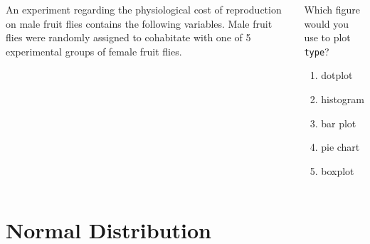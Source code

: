 \begin{frame}
\frametitle{\grp}
\begin{columns}
An experiment regarding the physiological cost of reproduction on male fruit flies contains the following variables. Male fruit flies were randomly assigned to cohabitate with one of 5 experimental groups of female fruit flies.  \\
\vskip10pt
\begin{clicker}{Which figure would you use to plot \texttt{type}?}
\begin{enumerate}
    \item dotplot
    \item histogram
    \item bar plot
    \item pie chart
    \item boxplot
\end{enumerate}
\end{clicker}
\end{columns}
\end{frame}




\section[Normal Distribution]{Normal Distribution}
\begin{frame}
\end{frame}

